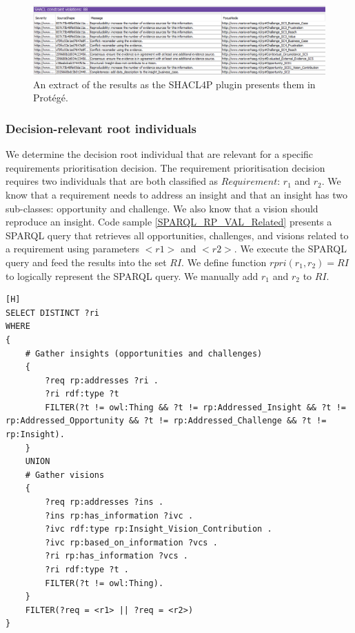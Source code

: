 \begin{figure}[H]
\centering
  \includegraphics[width=17cm]{../../Images/05_Validation/05_RP_SC_Results.png}
  \caption{An extract of the results as the SHACL4P plugin presents them in Prot\'eg\'e.}
  \label{fig:RP_SC_Results}
\end{figure}

\subsubsection{Decision-relevant root individuals}
We determine the decision root individual that are relevant for a specific requirements prioritisation decision. The requirement prioritisation decision requires two individuals that are both classified as $Requirement$: $r_1$ and $r_2$. We know that a requirement needs to address an insight and that an insight has two sub-classes: opportunity and challenge. We also know that a vision should reproduce an insight. Code sample \ref{SPARQL_RP_VAL_Related} presents a SPARQL query that retrieves all opportunities, challenges, and visions related to a requirement using parameters $<r1>$ and $<r2>$. We execute the SPARQL query and feed the results into the set $RI$. We define function $rpri(r_1,r_2) = RI$ to logically represent the SPARQL query. We manually add $r_1$ and $r_2$ to $RI$.

\begin{lstlisting}[float,language=SPARQL1,caption={The first part of the SPARQL query gathers the insight(s) related to the specified requirements based on the $addresses$ object property: a $Requirement$ $addresses$ an insight. The second part of the SPARQL query gathers the vision(s) related to the specified requirements based on the $addresses$, $has\_in{\f}ormation$, and $based\_on\_in{\f}ormation$ object properties.},label={SPARQL_RP_VAL_Related}][H]
SELECT DISTINCT ?ri 
WHERE 
{
	# Gather insights (opportunities and challenges)
	{
		?req rp:addresses ?ri .
		?ri rdf:type ?t
		FILTER(?t != owl:Thing && ?t != rp:Addressed_Insight &&	?t != rp:Addressed_Opportunity && ?t != rp:Addressed_Challenge && ?t != rp:Insight).
	}
	UNION
	# Gather visions
	{
		?req rp:addresses ?ins .
		?ins rp:has_information ?ivc .
		?ivc rdf:type rp:Insight_Vision_Contribution .
		?ivc rp:based_on_information ?vcs .
		?ri rp:has_information ?vcs .
		?ri rdf:type ?t .	
		FILTER(?t != owl:Thing).				
	}
	FILTER(?req = <r1> || ?req = <r2>)
}
\end{lstlisting}

